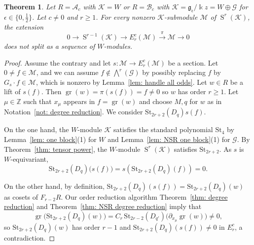 \documentclass[12pt]{amsart}
\theoremstyle{plain}
\newtheorem{theorem}{Theorem}[section]
\theoremstyle{definition}
\numberwithin{equation}{theorem}
\newcommand{\kk}{\Bbbk}
\newcommand{\Sa}{\operatorname{S}}
\newcommand{\gr}{\operatorname{gr}}
\newcommand{\ZZ}{\mathbb{Z}}
\newcommand{\mc}[1]{\mathcal{#1}}
\newcommand{\calA}{\mathcal A}
\newcommand{\calB}{\mathcal B}
\newcommand{\geps}{\mathfrak{g}_\epsilon}
\newcommand{\St}{\mathrm{St}}
\begin{document}
\begin{theorem}\label{thm: super Etingof conj}
    Let $R= \calA_c$ with $\mc{K} = W$ or $R = \calB_c$ with $\mc{K} = \geps/ \kk z = W \oplus \mc{G}$ for $\epsilon \in \{0, \frac{1}{2}\}$. Let $c \neq 0$ and $r \geq 1$. For every nonzero $\mc{K}$-submodule $\mc{M}$ of $\Sa^r(\mc{K})$, the extension 
    \[0 \longrightarrow \Sa^{r-1}(\mc{K}) \longrightarrow E^c_r (\mc{M}) \stackrel{\pi}{\longrightarrow} \mc{M} \longrightarrow 0\]
    does not split as a sequence of $W$-modules.
\end{theorem}
\begin{proof}
    Assume the contrary and let $s: \mc{M} \to E^c_r (\mc{M})$ be a  section. Let $0 \neq f \in \mc{M}$, and we can assume $f \notin \bigwedge^{r} (\mc{G})$ by possibly replacing $f$ by $G_s \cdot f \in \mc{M}$, which is nonzero by Lemma~\ref{lem: handle all odds}. Let $w \in R$ be a lift of $s(f)$. Then $\gr(w) = \pi(s(f)) = f \neq 0$ so $w$ has order $r \geq 1$. 
    Let $\mu \in \ZZ$ such that $x_\mu$ appears in $f = \gr(w)$ and choose $M, q$ for $w$ as in Notation~\ref{not: degree reduction}. We consider $\St_{2r+2}(D_q) s(f)$.

    On the one hand, the $W$-module $\mc{K}$ satisfies the standard polynomial $\St_4$ by Lemma~\ref{lem: one block}(1) for $W$ and Lemma~\ref{lem: NSR one block}(1) for $\mc{G}$. By Theorem~\ref{thm: tensor power}, the $W$-module $\Sa^r(\mc{K})$ satisfies $\St_{2r+2}$. As $s$ is $W$-equivariant,  
    \[\St_{2r+2}(D_q) \big(s(f)\big) = s(\St_{2r+2}(D_q)(f)) = 0.\]

    On the other hand, by definition, $\St_{2r+2}(D_q)(s(f)) = \St_{2r+2}(D_q)(w)$ as cosets of $F_{r-2} R$. Our order reduction algorithm Theorem~\ref{thm: degree reduction} and Theorem~\ref{thm: NSR degree reduction} imply that  
    \[\gr \big( \St_{2r+2}(D_q)(w) \big) = C_r \, \St_{2r-2}(D_{q'}) \big( \partial_{x_\mu} \gr(w) \big) \neq 0, \]
    so $\St_{2r+2}(D_q)(w)$ has order $r-1$ and $\St_{2r+2}(D_q)(s(f)) \neq 0$ in $E^c_r$, a contradiction.
\end{proof}
\end{document}
